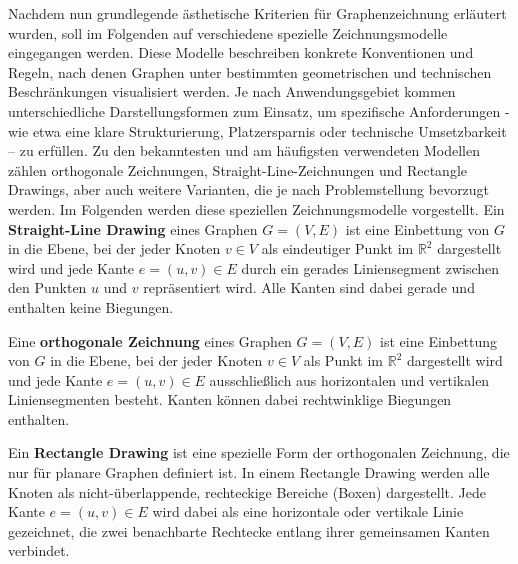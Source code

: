 \documentclass[bachelor, german]{algothesis}
\begin{document}
Nachdem nun grundlegende ästhetische Kriterien für Graphenzeichnung erläutert wurden, soll im Folgenden auf verschiedene spezielle Zeichnungsmodelle eingegangen werden. Diese Modelle beschreiben konkrete Konventionen und Regeln, nach denen Graphen unter bestimmten geometrischen und technischen Beschränkungen visualisiert werden.\newline
Je nach Anwendungsgebiet kommen unterschiedliche Darstellungsformen zum Einsatz, um spezifische Anforderungen - wie etwa eine klare Strukturierung, Platzersparnis oder technische Umsetzbarkeit – zu erfüllen. Zu den bekanntesten und am häufigsten verwendeten Modellen zählen orthogonale Zeichnungen, Straight-Line-Zeichnungen und Rectangle Drawings, aber auch weitere Varianten, die je nach Problemstellung bevorzugt werden.
Im Folgenden werden diese speziellen Zeichnungsmodelle vorgestellt\cite{Handbook}.\newline \newline
Ein \textbf{Straight-Line Drawing}  eines Graphen $G = (V,E)$ ist eine Einbettung von $G$ in die Ebene, bei der jeder Knoten $v \in V$ als eindeutiger Punkt im $\mathbb{R}^2$ dargestellt wird und jede Kante $e = (u,v) \in E$ durch ein gerades Liniensegment zwischen den Punkten $u$ und $v$ repräsentiert wird. Alle Kanten sind dabei gerade und enthalten keine Biegungen.\newline

Eine \textbf{orthogonale Zeichnung} eines Graphen $G = (V,E)$ ist eine Einbettung von $G$ in die Ebene, bei der jeder Knoten $v \in V$ als Punkt im $\mathbb{R}^2$ dargestellt wird und jede Kante $e = (u,v) \in E$ ausschließlich aus horizontalen und vertikalen Liniensegmenten besteht. Kanten können dabei rechtwinklige Biegungen enthalten.\newline

Ein \textbf{Rectangle Drawing} ist eine spezielle Form der orthogonalen Zeichnung, die nur für planare Graphen definiert ist. In einem Rectangle Drawing werden alle Knoten als nicht-überlappende, rechteckige Bereiche (Boxen) dargestellt. Jede Kante $e = (u,v) \in E$ wird dabei als eine horizontale oder vertikale Linie gezeichnet, die zwei benachbarte Rechtecke entlang ihrer gemeinsamen Kanten verbindet.\newline
\end{document}
